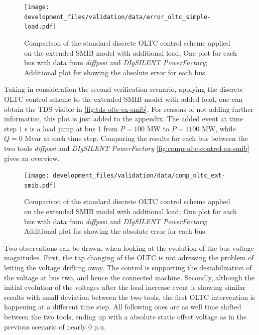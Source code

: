 \begin{figure}[htb!]
    \centering
    \texttt{[image: development\_files/validation/data/error\_oltc\_simple-load.pdf]}
    \caption[Bus and Error Comparison for the standard discrete \acs{OLTC} scheme applied on the extended \acs{SMIB} model with load]{Comparison of the standard discrete \acs{OLTC} control scheme applied on the extended \acs{SMIB} model with additional load; One plot for each bus with data from \textit{diffpssi} and \textit{DIgSILENT PowerFactory}; Additional plot for showing the absolute error for each bus.}
    \label{fig:comp-oltc-error-simple}
\end{figure}

Taking in consideration the second verification scenario, applying the discrete \acs{OLTC} control scheme to the extended \acs{SMIB} model with added load, one can obtain the \acs{TDS} visible in \autoref{fig:tds-oltc-ex-smib}.
For reasons of not adding further information, this plot is just added to the appendix.
The added event at time step $1$ s is a load jump at bus 1 from $P=100\text{ MW}$ to $P=1100\text{ MW}$, while $Q=0\text{ Mvar}$ at each time step.
Comparing the results for each bus between the two tools \textit{diffpssi} and \textit{DIgSILENT PowerFactory} \autoref{fig:comp-oltc-control-ex-smib} gives an overview.

\begin{figure}[htb!]
    \centering
    \texttt{[image: development\_files/validation/data/comp\_oltc\_ext-smib.pdf]}
    \caption[Bus and Error Comparison for the standard discrete \acs{OLTC} scheme applied on the extended \acs{SMIB} model with load]{Comparison of the standard discrete \acs{OLTC} control scheme applied on the extended \acs{SMIB} model with additional load; One plot for each bus with data from \textit{diffpssi} and \textit{DIgSILENT PowerFactory}; Additional plot for showing the absolute error for each bus.}
    \label{fig:comp-oltc-control-ex-smib}
\end{figure}

Two observations can be drawn, when looking at the evolution of the bus voltage magnitudes.
First, the tap changing of the \acs{OLTC} is not adressing the problem of letting the voltage drifting away.
The control is supporting the destabilization of the voltage at bus two, and hence the connected machine.
Secondly, although the initial evolution of the voltages after the load increase event is showing similar results with small deviation between the two tools, the first \acs{OLTC} intervention is happening at a different time step.
All following ones are as well time shifted between the two tools, ending up with a absolute static offset voltage as in the previous scenario of nearly $0$ p.u.

